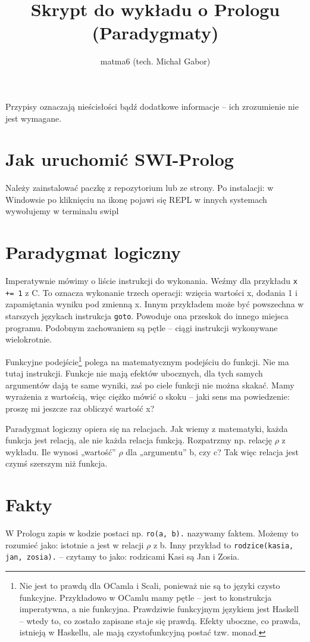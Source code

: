\documentclass[12pt,a4paper]{article}
\author{matma6 (tech. Michał Gabor)}
\title{Skrypt do wykładu o Prologu (Paradygmaty)}
\begin{document}
\maketitle
Przypisy oznaczają nieścisłości bądź dodatkowe informacje – ich zrozumienie nie jest wymagane.
\section{Jak uruchomić SWI-Prolog}
Należy zainstalować paczkę z repozytorium lub ze strony. Po instalacji:
w Windowsie po kliknięciu na ikonę pojawi się REPL
w innych systemach wywołujemy w terminalu swipl
\section{Paradygmat logiczny}
Imperatywnie mówimy o liście instrukcji do wykonania. Weźmy dla przykładu \verb!x += 1! z C. To oznacza wykonanie trzech operacji: wzięcia wartości x, dodania 1 i zapamiętania wyniku pod zmienną x. Innym przykładem może być powszechna w starszych językach instrukcja \verb!goto!. Powoduje ona przeskok do innego miejsca programu. Podobnym zachowaniem są pętle – ciągi instrukcji wykonywane wielokrotnie.

Funkcyjne podejście\footnote{Nie jest to prawdą dla OCamla i Scali, ponieważ nie są to języki czysto funkcyjne. Przykładowo w OCamlu mamy pętle – jest to konstrukcja imperatywna, a nie funkcyjna. Prawdziwie funkcyjnym językiem jest Haskell – wtedy to, co zostało zapisane staje się prawdą. Efekty uboczne, co prawda, istnieją w Haskellu, ale mają czystofunkcyjną postać tzw. monad.} polega na matematycznym podejściu do funkcji. Nie ma tutaj instrukcji. Funkcje nie mają efektów ubocznych, dla tych samych argumentów dają te same wyniki, zaś po ciele funkcji nie można skakać. Mamy wyrażenia z wartością, więc ciężko mówić o skoku – jaki sens ma powiedzenie: proszę mi jeszcze raz obliczyć wartość x?

Paradygmat logiczny opiera się na relacjach. Jak wiemy z matematyki, każda funkcja jest relacją, ale nie każda relacja funkcją. Rozpatrzmy np. relację $\rho$ z wykładu. Ile wynosi „wartość” $\rho$ dla „argumentu” b, czy c? Tak więc relacja jest czymś szerszym niż funkcja.

\section{Fakty}
W Prologu zapis w kodzie postaci np. \verb+ro(a, b).+ nazywamy faktem. Możemy to rozumieć jako: istotnie a jest w relacji $\rho$ z b. Inny przykład to \verb+rodzice(kasia, jan, zosia).+ – czytamy to jako: rodzicami Kasi są Jan i Zosia.
\end{document}
